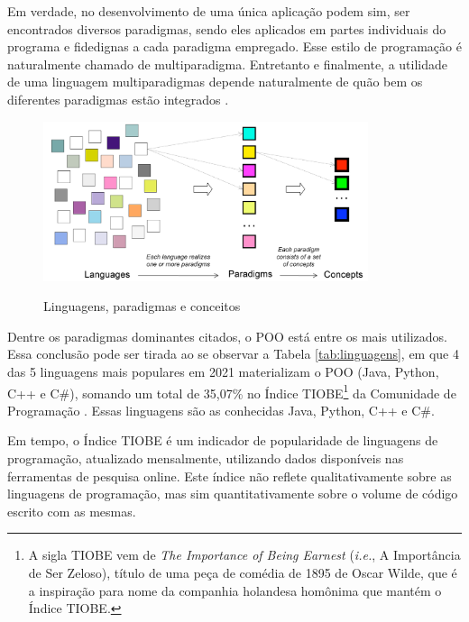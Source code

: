 Em verdade, no desenvolvimento de uma única aplicação podem sim, ser
encontrados diversos paradigmas, sendo eles aplicados em partes individuais do
programa e fidedignas a cada paradigma empregado. Esse estilo de programação é
naturalmente chamado de multiparadigma. Entretanto e finalmente, a utilidade de
uma linguagem multiparadigmas depende naturalmente de quão bem os diferentes
paradigmas estão integrados \cite{bjarne_1995,van_roy_2004}.

\begin{figure}[!htb]
  \centering
  \caption{Linguagens, paradigmas e conceitos}
  \includegraphics[width=0.85\textwidth]{../figures/concepts.png}
  \label{fig:concepts}
\end{figure}

Dentre os paradigmas dominantes citados, o POO está entre os mais utilizados.
Essa conclusão pode ser tirada ao se observar a Tabela \ref{tab:linguagens}, em
que 4 das 5 linguagens mais populares em 2021 materializam o POO (Java, Python,
C++ e C\#), somando um total de 35,07\% no Índice TIOBE\footnote{A sigla TIOBE
  vem de \textit{The Importance of Being Earnest} (\textit{i.e.}, A Importância de
  Ser Zeloso), título de uma peça de comédia de 1895 de Oscar Wilde, que é a
  inspiração para nome da companhia holandesa homônima que mantém o Índice TIOBE.}
da Comunidade de Programação \cite{tiobe_2021}. Essas linguagens são as
conhecidas Java, Python, C++ e C\#.

Em tempo, o Índice TIOBE é um indicador de popularidade de linguagens de
programação, atualizado mensalmente, utilizando dados disponíveis nas
ferramentas de pesquisa online. Este índice não reflete qualitativamente sobre
as linguagens de programação, mas sim quantitativamente sobre o volume de código
escrito com as mesmas.

